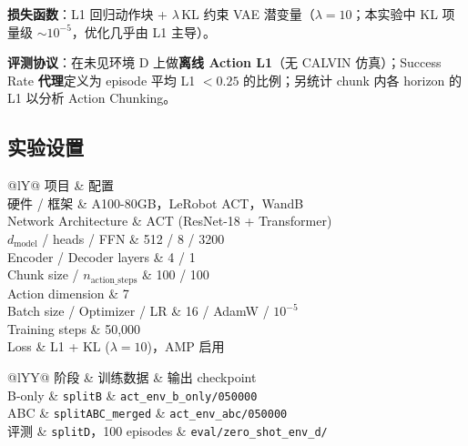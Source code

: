 \documentclass[10pt,twocolumn,letterpaper]{article}
\newcommand{\cvprtable}[1]{%
  \scriptsize
  \setlength{\tabcolsep}{2.5pt}%
  \renewcommand{\arraystretch}{1.08}%
  #1%
}
\begin{document}
\textbf{损失函数}：L1 回归动作块 + $\lambda$\,KL 约束 VAE 潜变量（$\lambda{=}10$；本实验中 KL 项量级 $\sim 10^{-5}$，优化几乎由 L1 主导）。

\textbf{评测协议}：在未见环境 D 上做\textbf{离线 Action L1}（无 CALVIN 仿真）；Success Rate \textbf{代理}定义为 episode 平均 L1 $< 0.25$ 的比例；另统计 chunk 内各 horizon 的 L1 以分析 Action Chunking。

\subsection{实验设置}
\label{sec:task2_setup}

\begin{table}[t]
  \centering
  \caption{题目二实验环境与 ACT 超参数（两阶段一致）。}
  \label{tab:act_hparams}
  \cvprtable{%
  \begin{tabularx}{\linewidth}{@{}lY@{}}
    \toprule
    项目 & 配置 \\
    \midrule
    硬件 / 框架 & A100-80GB，LeRobot ACT，WandB \\
    Network Architecture & ACT (ResNet-18 + Transformer) \\
    $d_{\mathrm{model}}$ / heads / FFN & 512 / 8 / 3200 \\
    Encoder / Decoder layers & 4 / 1 \\
    Chunk size / $n_{\mathrm{action\_steps}}$ & 100 / 100 \\
    Action dimension & 7 \\
    Batch size / Optimizer / LR & 16 / AdamW / $10^{-5}$ \\
    Training steps & 50{,}000 \\
    Loss & L1 + KL ($\lambda{=}10$)，AMP 启用 \\
    \bottomrule
  \end{tabularx}%
  }
\end{table}

\begin{table}[t]
  \centering
  \caption{题目二训练阶段与 Zero-shot 评测设置。}
  \label{tab:task2_protocol}
  \cvprtable{%
  \begin{tabularx}{\linewidth}{@{}lYY@{}}
    \toprule
    阶段 & 训练数据 & 输出 checkpoint \\
    \midrule
    B-only & \texttt{splitB} & \texttt{act\_env\_b\_only/050000} \\
    ABC & \texttt{splitABC\_merged} & \texttt{act\_env\_abc/050000} \\
    评测 & \texttt{splitD}，100 episodes & \texttt{eval/zero\_shot\_env\_d/} \\
    \bottomrule
  \end{tabularx}%
  }
\end{table}
\end{document}
